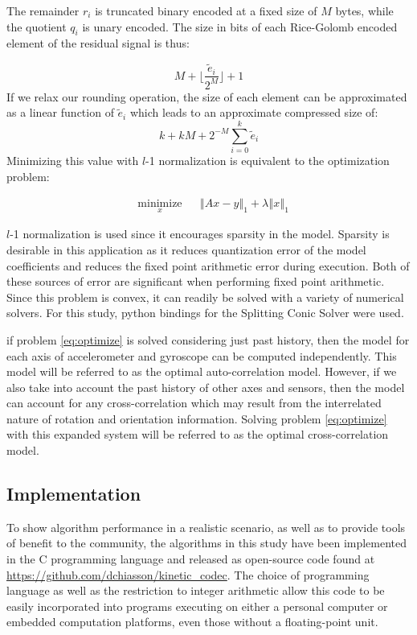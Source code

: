 \documentclass[journal]{IEEEtran}
\begin{document}
The remainder $r_i$ is truncated binary encoded at a fixed size of $M$ bytes, while the quotient $q_i$ is unary encoded. The size in bits of each Rice-Golomb encoded element of the residual signal is thus:

$$ M + \lfloor\frac{\tilde{e}_i}{2^M}\rfloor + 1$$
If we relax our rounding operation, the size of each element can be approximated as a linear function of $\tilde{e}_i$ which leads to an approximate compressed size of:
 $$k+kM+ 2^{-M}\sum_{i=0}^k \tilde{e}_i$$
 Minimizing this value with $l$-1 normalization is equivalent to the optimization problem:
 
\begin{equation}
\begin{aligned}
& \underset{x}{\text{minimize}}
& & \left\Vert Ax-y \right\Vert_1 + \lambda\left\Vert x \right\Vert_1
\label{eq:optimize}
\end{aligned}
\end{equation}

$l$-1 normalization is used since it encourages sparsity in the model. Sparsity is desirable in this application as it reduces quantization error of the model coefficients and reduces the fixed point arithmetic error during execution. Both of these sources of error are significant when performing fixed point arithmetic. Since this problem is convex, it can readily be solved with a variety of numerical solvers. For this study, python bindings for the Splitting Conic Solver were used\cite{ocpb:16}\cite{scs}\cite{cvxpy}.

if problem \eqref{eq:optimize} is solved considering just past history, then the model for each axis of accelerometer and gyroscope can be computed independently. This model will be referred to as the optimal auto-correlation model. However, if we also take into account the past history of other axes and sensors, then the model can account for any cross-correlation which may result from the interrelated nature of rotation and orientation information. Solving problem \eqref{eq:optimize} with this expanded system will be referred to as the optimal cross-correlation model.

\subsection{Implementation}

To show algorithm performance in a realistic scenario, as well as to provide tools of benefit to the community, the algorithms in this study have been implemented in the C programming language and released as open-source code found at \url{https://github.com/dchiasson/kinetic_codec}. The choice of programming language as well as the restriction to integer arithmetic allow this code to be easily incorporated into programs executing on either a personal computer or embedded computation platforms, even those without a floating-point unit.
\end{document}
